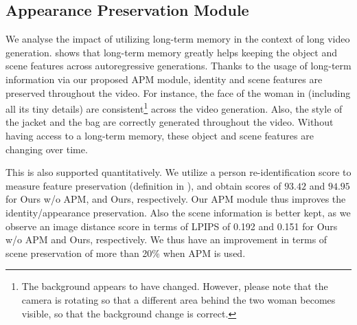 \subsection{Appearance Preservation Module}
\label{sec:appendix.ablation_studies.apm}
We analyse the impact of utilizing long-term memory in the context of long video generation.  
  shows that long-term memory greatly helps keeping the object and scene features across autoregressive generations.
Thanks to the usage of long-term information via our proposed APM module, identity and scene features are preserved throughout the video.  For instance, the face of the woman in  (including all its tiny details) are consistent\footnote{The background appears to have changed. However, please note that the camera is rotating so that a different area behind the two woman becomes visible, so that the background change is correct.} across the video generation.  Also, the style of the jacket and the bag are correctly generated throughout the video. 
Without having access to a long-term memory, these object and scene features are changing over time.  

This is also supported quantitatively. We utilize a person re-identification score to measure feature preservation (definition in ), and obtain scores of $93.42$ and $94.95$ for Ours w/o APM, and Ours, respectively. Our APM module thus improves the identity/appearance preservation. Also the scene information is better kept, as we observe an image distance score in terms of  LPIPS  \cite{zhang2018perceptual} of 0.192 and 0.151 for Ours w/o APM and Ours, respectively. 
We thus have an improvement in terms of scene preservation of more than 20\% when APM is used. 




